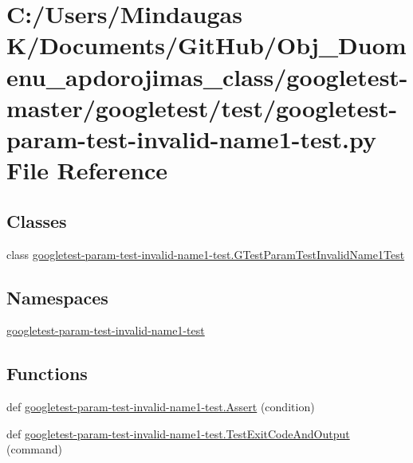 \hypertarget{googletest-master_2googletest_2test_2googletest-param-test-invalid-name1-test_8py}{}\section{C\+:/\+Users/\+Mindaugas K/\+Documents/\+Git\+Hub/\+Obj\+\_\+\+Duomenu\+\_\+apdorojimas\+\_\+class/googletest-\/master/googletest/test/googletest-\/param-\/test-\/invalid-\/name1-\/test.py File Reference}
\label{googletest-master_2googletest_2test_2googletest-param-test-invalid-name1-test_8py}
\subsection*{Classes}
\begin{DoxyCompactItemize}
\item 
class \mbox{\hyperlink{classgoogletest-param-test-invalid-name1-test_1_1_g_test_param_test_invalid_name1_test}{googletest-\/param-\/test-\/invalid-\/name1-\/test.\+G\+Test\+Param\+Test\+Invalid\+Name1\+Test}}
\end{DoxyCompactItemize}
\subsection*{Namespaces}
\begin{DoxyCompactItemize}
\item 
 \mbox{\hyperlink{namespacegoogletest-param-test-invalid-name1-test}{googletest-\/param-\/test-\/invalid-\/name1-\/test}}
\end{DoxyCompactItemize}
\subsection*{Functions}
\begin{DoxyCompactItemize}
\item 
def \mbox{\hyperlink{namespacegoogletest-param-test-invalid-name1-test_a2322bcd13b9e4fc90292b041a99fe368}{googletest-\/param-\/test-\/invalid-\/name1-\/test.\+Assert}} (condition)
\item 
def \mbox{\hyperlink{namespacegoogletest-param-test-invalid-name1-test_aabb7407b7c6d63bd6b06899c5f5bc02e}{googletest-\/param-\/test-\/invalid-\/name1-\/test.\+Test\+Exit\+Code\+And\+Output}} (command)
\end{DoxyCompactItemize}
